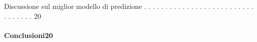 \documentclass[10pt]{article}
\begin{document}
	
	
		
	
	 \hspace{0.3cm}Discussione sul miglior modello di predizione . . . . . . . . . . . . . . . . . . . . . . . . . . . . . . . . . 20 \\ \\
	\vspace{0.8cm}
	\hspace{-0.2cm}\textbf{Conclusioni}\hspace{14.6cm}\textbf{20}

	\clearpage
	\let\clearpage\relax %
	
	
	
	
	
	
	\newpage
\end{document}
